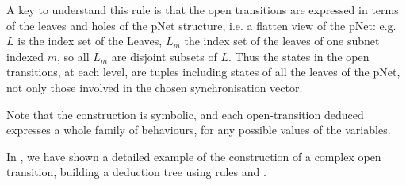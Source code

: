\documentclass{lmcs}
\newcommand{\TODO}[1]{\textcolor{red}{\textbf{[TODO:#1]}}}
\newcommand{\LUDO}[1]{\textcolor{darkgreen}{#1}}
\newtheorem{example}{Example}
\begin{document}
        	A key to understand this rule is that the open transitions are
	expressed in terms of the leaves and holes of the pNet structure,
	i.e. a flatten view of the pNet: e.g. $L$ is the index set of the
	Leaves, $L_m$ the index set of the leaves of one subnet indexed $m$, so all $L_m$
	are disjoint subsets of $L$. Thus the states in the open transitions,
	at each level, are tuples including states of all the
	leaves of the pNet, not only those involved in the chosen
	synchronisation vector.


Note that  the construction is symbolic, and each open-transition deduced expresses a whole family of
behaviours, for any possible values of the variables.
%

In \cite{henrio:Forte2016}, we have shown a detailed example of the construction of a complex open transition, building a deduction tree using rules \TrUn and \TrDeux.

  
\end{document}
